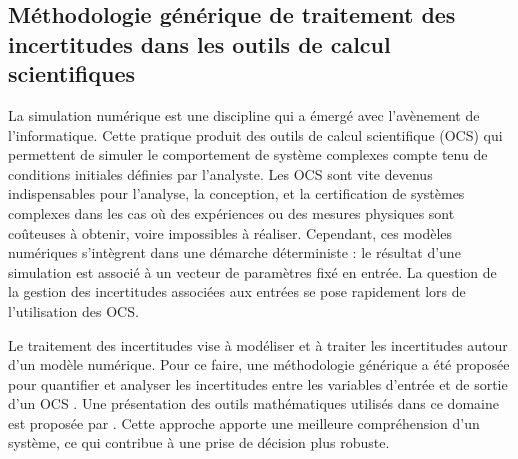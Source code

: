 \subsection*{Méthodologie générique de traitement des incertitudes dans les outils de calcul scientifiques}

La simulation numérique est une discipline qui a émergé avec l'avènement de l'informatique. 
Cette pratique produit des outils de calcul scientifique (OCS) qui permettent de simuler le comportement de système complexes compte tenu de conditions initiales définies par l'analyste. 
Les OCS sont vite devenus indispensables pour l'analyse, la conception, et la certification de systèmes complexes dans les cas o\`u des expériences ou des mesures physiques sont coûteuses à obtenir, voire impossibles à réaliser. 
Cependant, ces modèles numériques s'intègrent dans une démarche déterministe : le résultat d'une simulation est associé à un vecteur de paramètres fixé en entrée. 
La question de la gestion des incertitudes associées aux entrées se pose rapidement lors de l'utilisation des OCS. 

Le traitement des incertitudes vise à modéliser et à traiter les incertitudes autour d'un modèle numérique. 
Pour ce faire, une méthodologie générique a été proposée pour quantifier et analyser les incertitudes entre les variables d'entrée et de sortie d'un OCS \cite{rocquigny_2008}. 
Une présentation des outils mathématiques utilisés dans ce domaine est proposée par \cite{sullivan_2015}.
Cette approche apporte une meilleure compréhension d'un système, ce qui contribue à une prise de décision plus robuste.   


